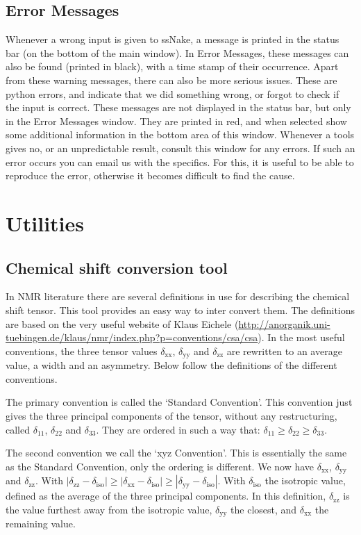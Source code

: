 \documentclass[11pt,a4paper]{article}
\begin{document}
\subsection{Error Messages}
Whenever a wrong input is given to ssNake, a message is printed in the status bar (on the bottom of the main window). In Error Messages, these messages
can also be found (printed in black), with a time stamp of their occurrence. Apart from these warning messages, there can also be more serious issues.
These are python errors, and indicate that we did something wrong, or forgot to check if the input is correct. These messages are not displayed in the
status bar, but only in the Error Messages window. They are printed in red, and when selected show some additional information in the bottom area of this window.
Whenever a tools gives no, or an unpredictable result, consult this window for any errors. If such an error occurs you can email us with the specifics.
For this, it is useful to be able to reproduce the error, otherwise it becomes difficult to find the cause.





\section{Utilities}
\subsection{Chemical shift conversion tool}
In NMR literature there are several definitions in use for describing the chemical shift tensor. This tool provides an easy way to inter convert them. The definitions are based on the very useful website of Klaus Eichele (\url{http://anorganik.uni-tuebingen.de/klaus/nmr/index.php?p=conventions/csa/csa}). In the most useful conventions, the three tensor values $\delta_\text{xx}$, $\delta_\text{yy}$ and $\delta_\text{zz}$ are rewritten to an average value, a width and an asymmetry. Below follow the definitions of the different conventions.

The primary convention is called the `Standard Convention'. This convention just gives the three principal components of the tensor, without any restructuring, called $\delta_\text{11}$, $\delta_\text{22}$ and $\delta_\text{33}$. They are ordered in such a way that: $\delta_\text{11} \geq \delta_\text{22} \geq \delta_\text{33}$.

The second convention we call the `xyz Convention'. This is essentially the same as the Standard Convention, only the ordering is different. We now have $\delta_\text{xx}$, $\delta_\text{yy}$ and $\delta_\text{zz}$. With $|\delta_\text{zz}-\delta_\text{iso}| \geq |\delta_\text{xx}-\delta_\text{iso}| \geq |\delta_\text{yy}-\delta_\text{iso}|$. With $\delta_\text{iso}$ the isotropic value, defined as the average of the three principal components. In this definition, $\delta_\text{zz}$ is the value furthest away from the isotropic value, $\delta_\text{yy}$ the closest, and $\delta_\text{xx}$ the remaining value.
\end{document}

